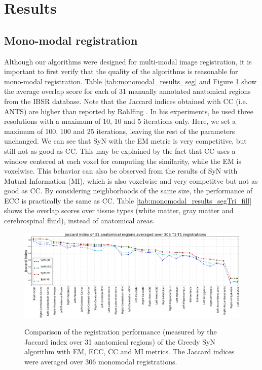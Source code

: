 \section{Results}

\subsection{Mono-modal registration}
Although our algorithms were designed for multi-modal image registration, it is important to first verify that the quality of the algorithms is reasonable for mono-modal registration. Table \ref{tab:monomodal_results_seg} and Figure \ref{fig:mono_graph_seg} show the average overlap score for each of 31 manually annotated anatomical regions from the IBSR database. Note that the Jaccard indices obtained with CC (i.e. ANTS) are higher than reported by Rohlfing \cite{Rohlfing2012}. In his experiments, he used three resolutions with a maximum of 10, 10 and 5 iterations only. Here, we set a maximum of 100, 100 and 25 iterations, leaving the rest of the parameters unchanged. We can see that SyN with the EM metric is very competitive, but still not as good as CC. This may be explained by the fact that CC uses a window centered at each voxel for computing the similarity, while the EM is voxelwise. This behavior can also be observed from the results of SyN with Mutual Information (MI), which is also voxelwise and very competitve but not as good as CC. By considering neighborhoods of the same size, the performance of ECC is practically the same as CC. Table \ref{tab:monomodal_results_segTri_fill} shows the overlap scores over tissue types (white matter, gray matter and cerebrospinal fluid), instead of anatomical areas.




\begin{figure}[t!]
\centering
\includegraphics[width=1.0\linewidth]{./images/mono_lines_seg.png}\\
\caption{Comparison of the registration performance (measured by the Jaccard index over 31 anatomical regions) of the Greedy SyN algorithm with EM, ECC, CC and MI metrics. The Jaccard
indices were averaged over 306 monomodal registrations.}
\label{fig:mono_graph_seg}
\end{figure}

